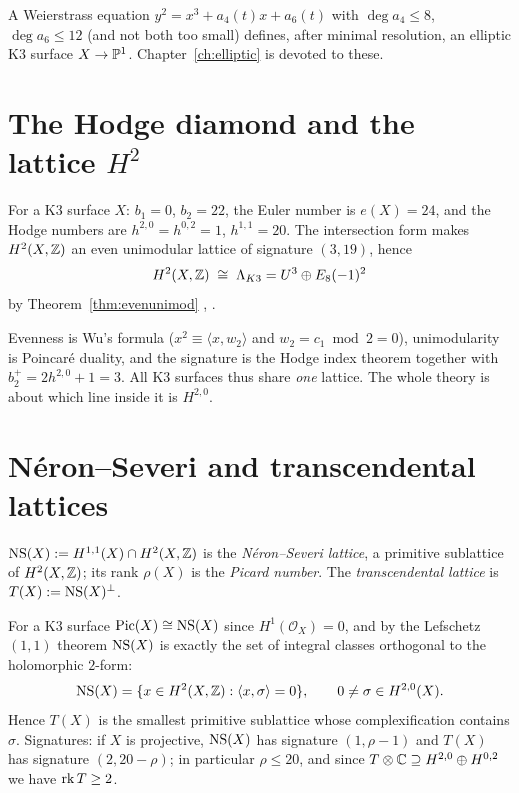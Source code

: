 \begin{example}
A Weierstrass equation $y^2=x^3+a_4(t)x+a_6(t)$ with $\deg a_4\le8$,
$\deg a_6\le12$ (and not both too small) defines, after minimal resolution,
an elliptic K3 surface $X\to\mathbb{P}^1$. Chapter~\ref{ch:elliptic} is devoted to
these.
\end{example}

\section{The Hodge diamond and the lattice $H^2$}

\begin{theorem}[\Lstatus]\label{thm:hodge}
For a K3 surface $X$: $b_1=0$, $b_2=22$, the Euler number is $e(X)=24$, and
the Hodge numbers are $h^{2,0}=h^{0,2}=1$, $h^{1,1}=20$. The intersection form
makes $H^2(X,\mathbb{Z})$ an even unimodular lattice of signature $(3,19)$, hence
\[
  H^2(X,\mathbb{Z})\;\cong\;\Lambda_{K3}=U^3\oplus E_8(-1)^2
\]
by Theorem~\ref{thm:evenunimod} \cite[Ch.~1, Prop.~3.5]{Huybrechts2016},
\cite[VIII.3]{BHPV2004}.
\end{theorem}

Evenness is Wu's formula ($x^2\equiv\langle x,w_2\rangle$ and $w_2=c_1\bmod 2=0$),
unimodularity is Poincar\'e duality, and the signature is the Hodge index
theorem together with $b_2^+=2h^{2,0}+1=3$. All K3 surfaces thus share
\emph{one} lattice. The whole theory is about which line inside it is
$H^{2,0}$.

\section{N\'eron--Severi and transcendental lattices}

\begin{definition}
$\operatorname{NS}(X):=H^{1,1}(X)\cap H^2(X,\mathbb{Z})$ is the \emph{N\'eron--Severi lattice}, a
primitive sublattice of $H^2(X,\mathbb{Z})$; its rank $\rho(X)$ is the \emph{Picard
number}. The \emph{transcendental lattice} is $T(X):=\operatorname{NS}(X)^{\perp}$.
\end{definition}

For a K3 surface $\operatorname{Pic}(X)\cong\operatorname{NS}(X)$ since $H^1(\mathcal O_X)=0$, and by the
Lefschetz $(1,1)$ theorem $\operatorname{NS}(X)$ is exactly the set of integral classes
orthogonal to the holomorphic $2$-form:
\[
  \operatorname{NS}(X)=\{x\in H^2(X,\mathbb{Z}):\langle x,\sigma\rangle=0\},\qquad
  0\neq\sigma\in H^{2,0}(X).
\]
Hence $T(X)$ is the smallest primitive sublattice whose complexification
contains $\sigma$. Signatures: if $X$ is projective, $\operatorname{NS}(X)$ has signature
$(1,\rho-1)$ and $T(X)$ has signature $(2,20-\rho)$; in particular $\rho\le20$,
and since $T\otimes\mathbb{C}\supseteq H^{2,0}\oplus H^{0,2}$ we have $\operatorname{rk} T\ge2$.

